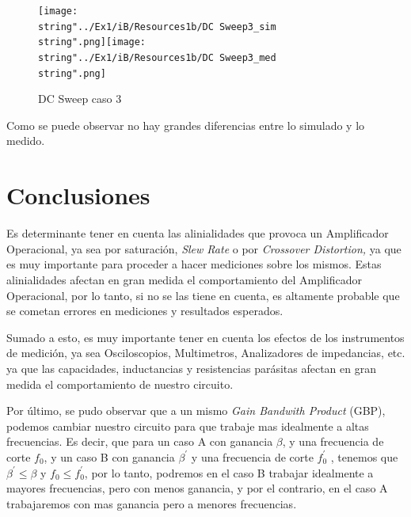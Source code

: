 \begin{figure}[H]
\begin{centering}
\texttt{[image: \\string"../Ex1/iB/Resources1b/DC Sweep3\_sim\\string".png]}\texttt{[image: \\string"../Ex1/iB/Resources1b/DC Sweep3\_med\\string".png]}
\par\end{centering}
\caption{DC Sweep caso 3}
\end{figure}

Como se puede observar no hay grandes diferencias entre lo simulado
y lo medido.

\section{Conclusiones}

Es determinante tener en cuenta las alinialidades que provoca un Amplificador
Operacional, ya sea por saturación, \emph{Slew Rate }o por \emph{Crossover
Distortion, }ya que es muy importante para proceder a hacer mediciones
sobre los mismos. Estas alinialidades afectan en gran medida el comportamiento
del Amplificador Operacional, por lo tanto, si no se las tiene en
cuenta, es altamente probable que se cometan errores en mediciones
y resultados esperados.

Sumado a esto, es muy importante tener en cuenta los efectos de los
instrumentos de medición, ya sea Osciloscopios, Multimetros, Analizadores
de impedancias, etc. ya que las capacidades, inductancias y resistencias
parásitas afectan en gran medida el comportamiento de nuestro circuito.

Por último, se pudo observar que a un mismo \emph{Gain Bandwith Product
}(GBP), podemos cambiar nuestro circuito para que trabaje mas idealmente
a altas frecuencias. Es decir, que para un caso A con ganancia $\beta$,
y una frecuencia de corte $f_{0}$, y un caso B con ganancia $\beta^{'}$
y una frecuencia de corte $f_{0}^{'}$ , tenemos que $\beta^{'}\leq\beta$
y $f_{0}\leq f_{0}^{'}$, por lo tanto, podremos en el caso B trabajar
idealmente a mayores frecuencias, pero con menos ganancia, y por el
contrario, en el caso A trabajaremos con mas ganancia pero a menores
frecuencias.
